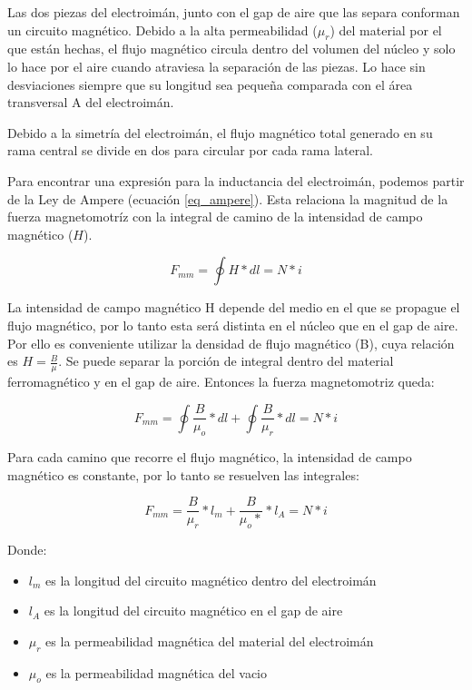 \noindent Las dos piezas del electroimán, junto con el gap de aire que las separa conforman un circuito magnético. Debido a la alta permeabilidad ($\mu_{r}$) del material por el que están hechas, el flujo magnético circula dentro del volumen del núcleo y solo lo hace por el aire cuando atraviesa la separación de las piezas. Lo hace sin desviaciones siempre que su longitud sea pequeña comparada con el área transversal A del electroimán.

\noindent Debido a la simetría del electroimán, el flujo magnético total generado en su rama central se divide en dos para circular por cada rama lateral.

\noindent Para encontrar una expresión para la inductancia del electroimán, podemos partir de la Ley de Ampere (ecuación \ref{eq_ampere}). Esta relaciona la magnitud de la fuerza magnetomotríz con la integral de camino de la intensidad de campo magnético ($H$).

\begin{equation} \label{eq_ampere}
	F_{mm}=\oint{H*dl}=N*i
\end{equation}

\noindent La intensidad de campo magnético H depende del medio en el que se propague el flujo magnético, por lo tanto esta será distinta en el núcleo que en el gap de aire. Por ello es conveniente utilizar la densidad de flujo magnético (B), cuya relación es $H=\frac{B}{\mu}$. Se puede separar la porción de integral dentro del material ferromagnético y en el gap de aire. Entonces la fuerza magnetomotriz queda:

\begin{equation} 
	F_{mm}=\oint{\frac{B}{\mu_{o}}*dl}+\oint{\frac{B}{\mu_{r}}*dl}=N*i
\end{equation}

\noindent Para cada camino que recorre el flujo magnético, la intensidad de campo magnético es constante, por lo tanto se resuelven las integrales:

\begin{equation}
	F_{mm}=\frac{B}{\mu_{r}}*l_{m}+\frac{B}{\mu_{o}*}*l_{A}=N*i
\end{equation}

Donde:
\begin{itemize}
	\item $l_{m}$ es la longitud del circuito magnético dentro del electroimán
	\item $l_{A}$ es la longitud del circuito magnético en el gap de aire
	\item $\mu_{r}$ es la permeabilidad magnética del material del electroimán
	\item $\mu_{o}$ es la permeabilidad magnética del vacio
\end{itemize}

